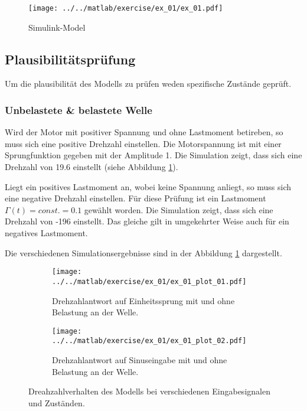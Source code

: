 

\begin{figure}[h!]
	\centering
	\texttt{[image: ../../matlab/exercise/ex\_01/ex\_01.pdf]}
	\caption{Simulink-Model}
\end{figure}

\subsection{Plausibilitätsprüfung}
Um die plausibilität des Modells zu prüfen weden spezifische Zustände geprüft.

\subsubsection{Unbelastete \& belastete Welle}
Wird der Motor mit positiver Spannung und ohne Lastmoment betireben, so muss
sich eine positive Drehzahl einstellen. Die Motorspannung ist mit einer
Sprungfunktion gegeben mit der Amplitude 1. Die Simulation zeigt, dass sich
eine Drehzahl von 19.6 einstellt (siehe Abbildung \ref{fig:ex_01_plot_01}).

Liegt ein positives Lastmoment an, wobei keine Spannung anliegt, so muss sich
eine negative Drehzahl einstellen. Für diese Prüfung ist ein Lastmoment
$\Gamma(t) = const. = 0.1$ gewählt worden. Die Simulation zeigt, dass sich eine
Drehzahl von -196 einstellt. Das gleiche gilt in umgekehrter Weise auch für
ein negatives Lastmoment.

Die verschiedenen Simulationsergebnisse sind in der Abbildung
\ref{fig:ex_01_plot_01} dargestellt.

\begin{figure}[h!]
	\centering
	\begin{subfigure}{0.45\textwidth}
		\centering
		\texttt{[image: ../../matlab/exercise/ex\_01/ex\_01\_plot\_01.pdf]}
		\caption{Drehzahlantwort auf Einheitssprung mit und ohne
			Belastung an der Welle.}
		\label{fig:ex_01_plot_01}
	\end{subfigure}
	\hfill{}
	\begin{subfigure}{0.45\textwidth}
		\centering
		\texttt{[image: ../../matlab/exercise/ex\_01/ex\_01\_plot\_02.pdf]}
		\caption{Drehzahlantwort auf Sinuseingabe mit und ohne
			Belastung an der Welle.}
		\label{fig:ex_01_plot_02}
	\end{subfigure}
	\caption{Dreahzahlverhalten des Modells bei verschiedenen
		Eingabesignalen und Zuständen.}
	\label{fig:ex_01_plot}
\end{figure}

